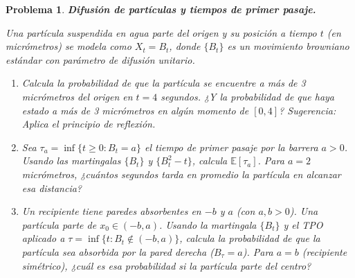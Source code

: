 \documentclass[12pt]{article}
\newtheorem{problem}{Problema}
\begin{document}
\begin{problem}
\textbf{Difusión de partículas y tiempos de primer pasaje.}

Una partícula suspendida en agua parte del origen y su posición a tiempo $t$ (en micrómetros) se modela como $X_t = B_t$, donde $\{B_t\}$ es un movimiento browniano estándar con parámetro de difusión unitario.

\begin{enumerate}
    \item[(a)] Calcula la probabilidad de que la partícula se encuentre a más de 3 micrómetros del origen en $t = 4$ segundos. ¿Y la probabilidad de que haya estado a más de 3 micrómetros en algún momento de $[0, 4]$? \textit{Sugerencia:} Aplica el principio de reflexión.

    \item[(b)] Sea $\tau_a = \inf\{t \ge 0 : B_t = a\}$ el tiempo de primer pasaje por la barrera $a > 0$. Usando las martingalas $\{B_t\}$ y $\{B_t^2 - t\}$, calcula $\mathbb{E}[\tau_a]$. Para $a = 2$ micrómetros, ¿cuántos segundos tarda en promedio la partícula en alcanzar esa distancia?

    \item[(c)] Un recipiente tiene paredes absorbentes en $-b$ y $a$ (con $a, b > 0$). Una partícula parte de $x_0 \in (-b, a)$. Usando la martingala $\{B_t\}$ y el TPO aplicado a $\tau = \inf\{t : B_t \notin (-b, a)\}$, calcula la probabilidad de que la partícula sea absorbida por la pared derecha ($B_\tau = a$). Para $a = b$ (recipiente simétrico), ¿cuál es esa probabilidad si la partícula parte del centro?
\end{enumerate}
\end{problem}



\end{document}
